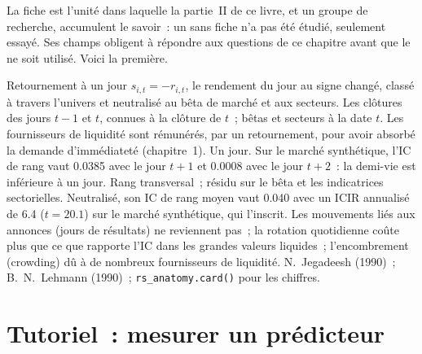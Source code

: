La fiche est l'unité dans laquelle la partie~II de ce livre, et un groupe de recherche, accumulent le savoir~: un  sans fiche
n'a pas été étudié, seulement essayé. Ses champs obligent à répondre aux questions de ce chapitre avant que le  ne soit utilisé. Voici
la première.

\begin{predictorcard}{Retournement à un jour}\label{pred:rs:anatomy-of-a-predictor:reversal}
 $s_{i,t} = -r_{i,t}$, le rendement du jour au signe changé, classé à travers l'univers et neutralisé au bêta de
marché et aux secteurs.
 Les clôtures des jours $t-1$ et $t$, connues à la clôture de $t$~; bêtas et secteurs à la date $t$.
 Les fournisseurs de liquidité sont rémunérés, par un retournement, pour avoir absorbé la demande d'immédiateté (chapitre~1).
 Un jour. Sur le marché synthétique, l'IC de rang vaut 0.0385 avec le jour $t+1$ et 0.0008 avec le jour
$t+2$~: la demi-vie est inférieure à un jour.
 Rang transversal~; résidu sur le bêta et les indicatrices sectorielles. Neutralisé, son IC de rang moyen vaut
0.040 avec un ICIR annualisé de 6.4 ($t = 20.1$) sur le marché synthétique, qui l'inscrit.
 Les mouvements liés aux annonces (jours de résultats) ne reviennent pas~; la rotation quotidienne coûte
plus que ce que rapporte l'IC dans les grandes valeurs liquides~; l'encombrement (crowding) dû à de nombreux fournisseurs de liquidité.
 N.~Jegadeesh (1990)~; B.~N.~Lehmann (1990)~; \texttt{rs\_anatomy.card()} pour les chiffres.
\end{predictorcard}

\section{Tutoriel~: mesurer un prédicteur}\label{tut:rs:anatomy-of-a-predictor:measure}

